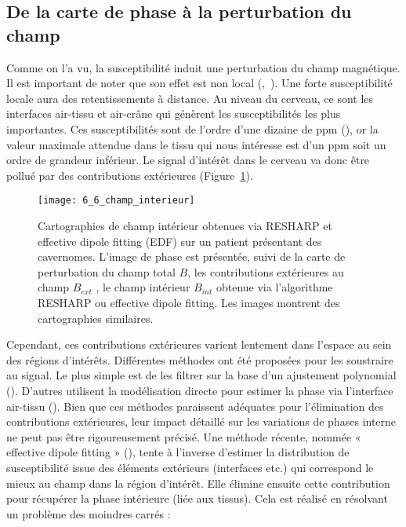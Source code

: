 {\subsection{De la carte de phase à la perturbation du champ}
\label{sec:cartephasechamp}
Comme on l’a vu, la susceptibilité induit une perturbation du champ magnétique. Il est
important de noter que son effet est non local (\cite{Li2004},~\cite{Schweser2011}). Une forte susceptibilité locale aura des
retentissements à distance. Au niveau du cerveau, ce sont les interfaces air-tissu et air-crâne qui
génèrent les susceptibilités les plus importantes. Ces susceptibilités sont de l’ordre d’une dizaine de
ppm (\cite{Schenck1996}), or la valeur maximale attendue dans le tissu qui nous intéresse est d’un ppm soit un ordre
de grandeur inférieur. Le signal d’intérêt dans le cerveau va donc être pollué par des contributions
extérieures (Figure~\ref{fig:6_6_champ_interieur}). 
\begin{figure}[!t]
\centering
\texttt{[image: 6\_6\_champ\_interieur]}
\caption{Cartographies de champ intérieur obtenues via RESHARP et effective dipole fitting (EDF) sur un patient
présentant des cavernomes. L’image de phase est présentée, suivi de la carte de perturbation du champ total $B$, les
contributions extérieures au champ $B_{ext}$ , le champ intérieur $B_{int}$ obtenue via l’algorithme RESHARP ou effective dipole
fitting. Les images montrent des cartographies similaires.}
\label{fig:6_6_champ_interieur}	
\end{figure}
Cependant, ces contributions extérieures varient lentement dans l’espace au
sein des régions d’intérêts. Différentes méthodes ont été proposées pour les soustraire au signal. Le
plus simple est de les filtrer sur la base d’un ajustement polynomial (\cite{Duyn2007}). D’autres utilisent la
modélisation directe pour estimer la phase via l’interface air-tissu (\cite{Neelavalli2009}). Bien que ces méthodes
paraissent adéquates pour l’élimination des contributions extérieures, leur impact détaillé sur les
variations de phases interne ne peut pas être rigoureusement précisé. Une méthode récente, nommée
« effective dipole fitting » (\cite{Liu2011b}), tente à l’inverse d’estimer la distribution de susceptibilité issue des
éléments extérieurs (interfaces etc.) qui correspond le mieux au champ dans la région d’intérêt. Elle
élimine ensuite cette contribution pour récupérer la phase intérieure (liée aux tissus). Cela est réalisé
en résolvant un problème des moindres carrés :
\begin{equation}

\end{equation}}
